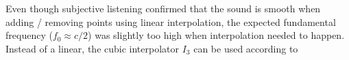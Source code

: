 \documentclass[dvipsnames]{article}
\begin{document}
Even though subjective listening confirmed that the sound is smooth when adding / removing points using linear interpolation, the expected fundamental frequency ($f_0 \approx c/2$) was slightly too high when interpolation needed to happen. Instead of a linear, the cubic interpolator $I_3$ can be used according to 
\end{document}
